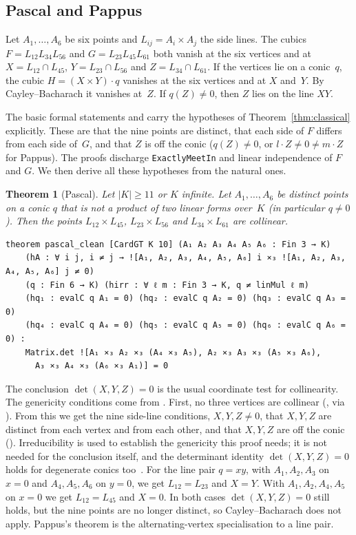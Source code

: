 \documentclass[11pt]{article}
\newtheorem{theorem}{Theorem}
\theoremstyle{definition}
\theoremstyle{remark}
\newcommand{\lean}[1]{\texttt{#1}}
\begin{document}
\subsection{Pascal and Pappus}

Let $A_1,\dots,A_6$ be six points and $L_{ij}=A_i\times A_j$ the side lines. The cubics
$F=L_{12}L_{34}L_{56}$ and $G=L_{23}L_{45}L_{61}$ both vanish at the six vertices and at
$X=L_{12}\cap L_{45}$, $Y=L_{23}\cap L_{56}$ and $Z=L_{34}\cap L_{61}$. If the vertices lie on a
conic~$q$, the cubic $H=(X\times Y)\cdot q$ vanishes at the six vertices and at $X$ and~$Y$. By
Cayley--Bacharach it vanishes at~$Z$. If $q(Z)\ne0$, then $Z$ lies on the line $XY$.

The basic formal statements  and
 carry the hypotheses of Theorem~\ref{thm:classical}
explicitly. These are that the nine points are distinct, that each side of $F$ differs from each
side of~$G$, and that $Z$ is off the conic ($q(Z)\ne0$, or $l\cdot Z\ne0\ne m\cdot Z$ for Pappus). The proofs discharge \lean{ExactlyMeetIn} and linear
independence of $F$ and $G$. We then derive all these hypotheses from the natural ones.

\begin{theorem}[Pascal]\label{thm:pascal}
Let $|K|\ge11$ or $K$ infinite. Let $A_1,\dots,A_6$ be distinct points on a conic $q$ that is not
a product of two linear forms over~$K$ (in particular $q\ne0$). Then the points $L_{12}\times L_{45}$,
$L_{23}\times L_{56}$ and $L_{34}\times L_{61}$ are collinear.
\end{theorem}

\begin{lstlisting}
theorem pascal_clean [CardGT K 10] (A₁ A₂ A₃ A₄ A₅ A₆ : Fin 3 → K)
    (hA : ∀ i j, i ≠ j → ![A₁, A₂, A₃, A₄, A₅, A₆] i ⨯₃ ![A₁, A₂, A₃, A₄, A₅, A₆] j ≠ 0)
    (q : Fin 6 → K) (hirr : ∀ ℓ m : Fin 3 → K, q ≠ linMul ℓ m)
    (hq₁ : evalC q A₁ = 0) (hq₂ : evalC q A₂ = 0) (hq₃ : evalC q A₃ = 0)
    (hq₄ : evalC q A₄ = 0) (hq₅ : evalC q A₅ = 0) (hq₆ : evalC q A₆ = 0) :
    Matrix.det ![A₁ ⨯₃ A₂ ⨯₃ (A₄ ⨯₃ A₅), A₂ ⨯₃ A₃ ⨯₃ (A₅ ⨯₃ A₆),
      A₃ ⨯₃ A₄ ⨯₃ (A₆ ⨯₃ A₁)] = 0
\end{lstlisting}

The conclusion $\det(X,Y,Z)=0$ is the usual coordinate test for collinearity. The genericity
conditions come from . First, no three vertices are collinear
(, via ). From this we get the nine
side-line conditions, $X,Y,Z\ne0$, that $X,Y,Z$ are distinct from each vertex and from each
other, and that $X,Y,Z$ are off the conic (). Irreducibility is used to establish the genericity this proof needs; it is not needed for the
conclusion itself, and the determinant identity $\det(X,Y,Z)=0$ holds for degenerate conics too~\cite{PascalHexagon}. For the line pair $q=xy$, with $A_1,A_2,A_3$ on $x=0$ and
$A_4,A_5,A_6$ on $y=0$, we get $L_{12}=L_{23}$ and $X=Y$. With $A_1,A_2,A_4,A_5$ on $x=0$ we get
$L_{12}=L_{45}$ and $X=0$. In both cases $\det(X,Y,Z)=0$ still holds, but the nine points are no
longer distinct, so Cayley--Bacharach does not apply. Pappus's theorem is the alternating-vertex
specialisation to a line pair.
\end{document}
